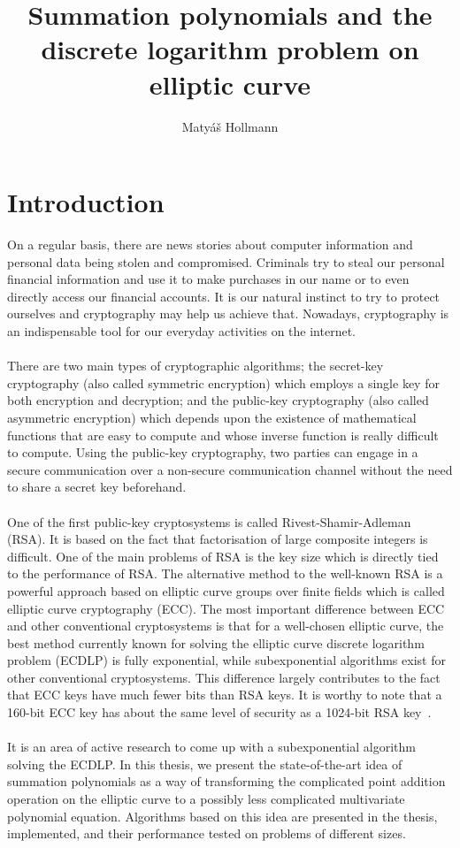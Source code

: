 \documentclass[thesis=M,english]{FITthesis}[2012/10/20]
\title{Summation polynomials and the discrete logarithm problem on elliptic curve}
\author{Matyáš Hollmann} %
\theoremstyle{remark}
\theoremstyle{definition}
\begin{document}

\chapter{Introduction}
On a regular basis, there are news stories about computer information and personal data being stolen and compromised. Criminals try to steal our personal financial information and use it to make purchases in our name or to even directly access our financial accounts. It is our natural instinct to try to protect ourselves and cryptography may help us achieve that. Nowadays, cryptography is an indispensable tool for our everyday activities on the internet. \\ \\
\noindent There are two main types of cryptographic algorithms; the secret-key cryptography (also called symmetric encryption) which employs a single key for both encryption and decryption; and the public-key cryptography (also called asymmetric encryption) which depends upon the existence of mathematical functions that are easy to compute and whose inverse function is really difficult to compute. Using the public-key cryptography, two parties can engage in a secure communication over a non-secure communication channel without the need to share a secret key beforehand. \\ \\
\noindent One of the first public-key cryptosystems is called Rivest-Shamir-Adleman (RSA). It is based on the fact that factorisation of large composite integers is difficult. One of the main problems of RSA is the key size which is directly tied to the performance of RSA. The alternative method to the well-known RSA is a powerful approach based on elliptic curve groups over finite fields which is called elliptic curve cryptography (ECC). The most important difference between ECC and other conventional cryptosystems is that for a well-chosen elliptic curve, the best method currently known for solving the elliptic curve discrete logarithm problem (ECDLP) is fully exponential, while subexponential algorithms exist for other conventional cryptosystems. This difference largely contributes to the fact that ECC keys have much fewer bits than RSA keys. It is worthy to note that a 160-bit ECC key has about the same level of security as a 1024-bit RSA key~\cite{secTest}.
\\
\\
\noindent 
It is an area of active research to come up with a subexponential algorithm solving the ECDLP. In this thesis, we present the state-of-the-art idea of summation polynomials as a way of transforming the complicated point addition operation on the elliptic curve to a possibly less complicated multivariate polynomial equation. Algorithms based on this idea are presented in the thesis, implemented, and their performance tested on problems of different sizes.  
\end{document}
